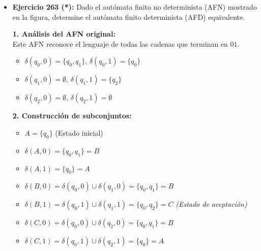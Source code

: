 \documentclass[12pt]{article}
\begin{document}
\begin{itemize}
\begin{center}
{
    }
    \end{center}

    \vspace{0.6cm}

    \item \textbf{Ejercicio 263 (*):} Dado el autómata finito no determinista (AFN) mostrado en la figura, determine el autómata finito determinista (AFD) equivalente.

    \textbf{1. Análisis del AFN original:} \\
    Este AFN reconoce el lenguaje de todas las cadenas que terminan en $01$.
    \begin{itemize}
        \item $\delta(q_0, 0) = \{q_0, q_1\}$, $\delta(q_0, 1) = \{q_0\}$
        \item $\delta(q_1, 0) = \emptyset$, $\delta(q_1, 1) = \{q_2\}$
        \item $\delta(q_2, 0) = \emptyset$, $\delta(q_2, 1) = \emptyset$
    \end{itemize}

    \textbf{2. Construcción de subconjuntos:}
    \begin{itemize}
        \item $A = \{q_0\}$ (Estado inicial)
        \item $\delta(A, 0) = \{q_0, q_1\} = B$
        \item $\delta(A, 1) = \{q_0\} = A$
        \item $\delta(B, 0) = \delta(q_0, 0) \cup \delta(q_1, 0) = \{q_0, q_1\} = B$
        \item $\delta(B, 1) = \delta(q_0, 1) \cup \delta(q_1, 1) = \{q_0, q_2\} = C$ \textit{(Estado de aceptación)}
        \item $\delta(C, 0) = \delta(q_0, 0) \cup \delta(q_2, 0) = \{q_0, q_1\} = B$
        \item $\delta(C, 1) = \delta(q_0, 1) \cup \delta(q_2, 1) = \{q_0\} = A$
    \end{itemize}


\end{itemize}
\end{document}
